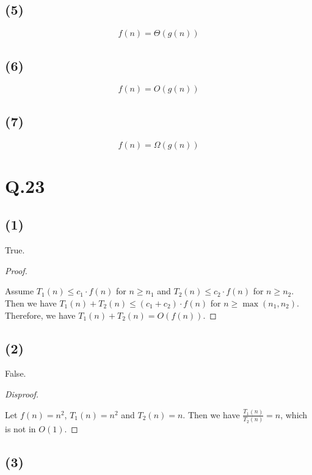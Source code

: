 \documentclass[a4paper,12pt]{article}
\begin{document}
\subsection*{(5)}
\begin{equation*}
	f(n) = \Theta(g(n))
\end{equation*}

\subsection*{(6)}
\begin{equation*}
	f(n) = O(g(n))
\end{equation*}

\subsection*{(7)}
\begin{equation*}
	f(n) = \Omega(g(n))
\end{equation*}

\section*{Q.23}

\subsection*{(1)}

True.

\begin{proof}
$ $

Assume $T_1(n) \leq c_1 \cdot f(n)$ for $n \geq n_1$ and $T_2(n) \leq c_2 \cdot f(n)$ for $n \geq n_2$.
Then we have $T_1(n) + T_2(n) \leq  (c_1 + c_2) \cdot f(n)$ for $n \geq \max(n_1, n_2)$.
Therefore, we have $T_1(n) + T_2(n) = O(f(n))$.
\end{proof}

\subsection*{(2)}

False.

\begin{proof}[Disproof]
$ $

Let $f(n) = n^2$, $T_1(n) = n^2$ and $T_2(n) = n$.
Then we have $\frac{T_1(n)}{T_2(n)} = n$, which is not in $O(1)$.
\end{proof}

\subsection*{(3)}
\end{document}
